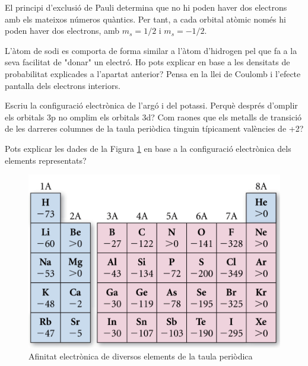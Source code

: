El principi d'exclusió de Pauli determina que no hi poden haver dos electrons amb els mateixos números quàntics. Per tant, a cada orbital atòmic només hi poden haver dos electrons, amb $m_s=1/2$ i $m_s=-1/2$.
\begin{exr}
L'àtom de sodi es comporta de forma similar a l'àtom d'hidrogen pel que fa a la seva facilitat de "donar" un electró. Ho pots explicar en base a les densitats de probabilitat explicades a l'apartat anterior? Pensa en la llei de Coulomb i l'efecte pantalla dels electrons interiors.
\end{exr}
\begin{exr}
Escriu la configuració electrònica de l'argó i del potassi. Perquè després d'omplir els orbitals 3p no omplim els orbitals 3d? Com raones que els metalls de transició de les  darreres columnes de la taula periòdica tinguin típicament valències de +2?
\end{exr}
\begin{exr}
Pots explicar les dades de la Figura \ref{fig:AfinitatElectronica} en base a la configuració electrònica dels elements representats?
\end{exr}
\begin{figure}[h]
\centering
\includegraphics[scale=0.5]{figures/AfinitatElectronica.png}
\caption{Afinitat electrònica de diversos elements de la taula periòdica}
\label{fig:AfinitatElectronica}
\end{figure}